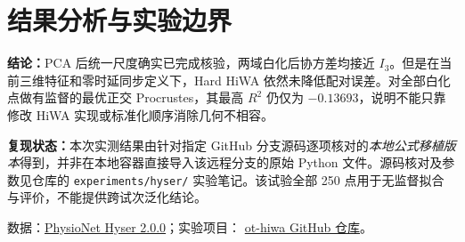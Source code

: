 \documentclass[UTF8,fontset=none,11pt,a4paper]{ctexart}
\begin{document}
\clearpage
\section{结果分析与实验边界}
\begin{center}
\end{center}
\noindent\textbf{结论：}PCA 后统一尺度确实已完成核验，两域白化后协方差均接近 $I_3$。但是在当前三维特征和零时延同步定义下，Hard HiWA 依然未降低配对误差。对全部白化点做有监督的最优正交 Procrustes，其最高 $R^2$ 仍仅为 $-0.13693$，说明不能只靠修改 HiWA 实现或标准化顺序消除几何不相容。

\noindent\textbf{复现状态：}本次实测结果由针对指定 GitHub 分支源码逐项核对的\emph{本地公式移植版本}得到，并非在本地容器直接导入该远程分支的原始 Python 文件。源码核对及参数见仓库的 \texttt{experiments/hyser/} 实验笔记。该试验全部 250 点用于无监督拟合与评价，不能提供跨试次泛化结论。

\par\noindent\small
数据：\href{https://physionet.org/content/hd-semg/2.0.0/}{PhysioNet Hyser 2.0.0}；实验项目：
\href{https://github.com/noelabernathy400-bot/ot-hiwa}{ot-hiwa GitHub 仓库}。
\end{document}
